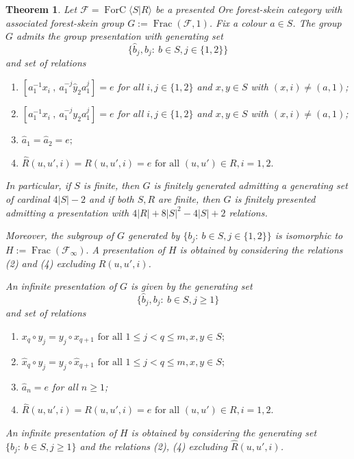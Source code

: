 \documentclass[a4paper, 12pt]{amsart}
\numberwithin{equation}{section}
\newtheorem{theorem}{Theorem}[section]
\theoremstyle{definition}
\newcommand{\cF}{\mathcal F}
\DeclareMathOperator{\Frac}{Frac}
\DeclareMathOperator{\FC}{ForC}
\newcommand{\wh}{\widehat}
\begin{document}
\begin{theorem}\label{theo:groupG-presentation}
Let $\cF=\FC\langle S|R\rangle$ be a presented Ore forest-skein category with associated forest-skein group $G:=\Frac(\cF,1)$.
Fix a colour $a\in S$.
The group $G$ admits the group presentation with generating set
$$\{ \wh b_j, b_j:\ b\in S, j\in\{1,2\}\}$$
and set of relations
\begin{enumerate}
\item $[ a_1^{-1} x_i \ ,\ a_1^{-j}\wh y_2a_1^j]=e$ for all $i,j\in\{1,2\}$ and $x,y\in S$ with $(x,i)\neq (a,1)$;
\item $[ a_1^{-1} x_i \ ,\ a_1^{-j}y_2a_1^j]=e$ for all $i,j\in\{1,2\}$ and $x,y\in S$ with $(x,i)\neq (a,1)$;
\item $\wh a_1= \wh a_2 =e;$
\item $\widehat{R}(u,u',i)=R(u,u',i)=e \text{ for all } (u,u')\in R, i=1,2.$
\end{enumerate}
In particular, if $S$ is finite, then $G$ is finitely generated admitting a generating set of cardinal $4|S|-2$ and if both $S,R$ are finite, then $G$ is finitely presented admitting a presentation with $4|R|+8|S|^2-4|S|+2$ relations.

Moreover, the subgroup of $G$ generated by $\{b_j:\ b\in S, j\in\{1,2\}\}$ is isomorphic to $H:=\Frac(\cF_\infty).$
A presentation of $H$ is obtained by considering the relations (2) and (4) excluding $\wh R(u,u',i)$.

An infinite presentation of $G$ is given by the generating set
$$\{ \wh b_j, b_j:\ b\in S, j\geq 1\}$$
and set of relations
\begin{enumerate}
\item $x_q\circ y_j = y_j \circ x_{q+1} \text{ for all } 1\leq j <q \leq m, x,y\in S;$ 
\item $\wh x_q\circ y_j = y_j \circ \wh x_{q+1} \text{ for all } 1\leq j <q \leq m, x,y\in S;$
\item $\wh a_n=e$ for all $n\geq 1$;
\item $\wh{R}(u,u',i)=R(u,u',i)=e \text{ for all } (u,u')\in R, i=1,2.$
\end{enumerate}
An infinite presentation of $H$ is obtained by considering the generating set $\{b_j:\ b\in S, j\geq 1 \}$ and the relations (2), (4) excluding $\wh R(u,u',i)$.
\end{theorem}
\end{document}

